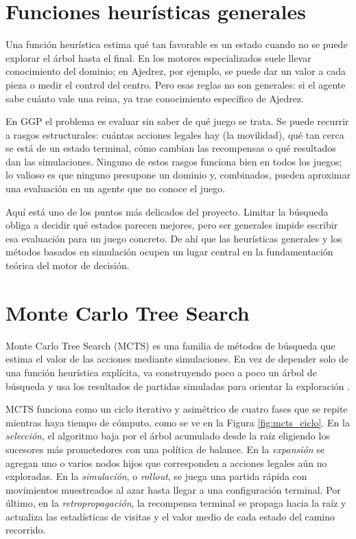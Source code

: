 \section{Funciones heurísticas generales}

Una función heurística estima qué tan favorable es un estado cuando no se puede explorar el árbol hasta el final. En los motores especializados suele llevar conocimiento del dominio; en Ajedrez, por ejemplo, se puede dar un valor a cada pieza o medir el control del centro. Pero esas reglas no son generales: si el agente sabe cuánto vale una reina, ya trae conocimiento específico de Ajedrez.

En GGP el problema es evaluar sin saber de qué juego se trata. Se puede recurrir a rasgos estructurales: cuántas acciones legales hay (la movilidad), qué tan cerca se está de un estado terminal, cómo cambian las recompensas o qué resultados dan las simulaciones. Ninguno de estos rasgos funciona bien en todos los juegos; lo valioso es que ninguno presupone un dominio y, combinados, pueden aproximar una evaluación en un agente que no conoce el juego.

Aquí está uno de los puntos más delicados del proyecto. Limitar la búsqueda obliga a decidir qué estados parecen mejores, pero ser generales impide escribir esa evaluación para un juego concreto. De ahí que las heurísticas generales y los métodos basados en simulación ocupen un lugar central en la fundamentación teórica del motor de decisión.

\section{Monte Carlo Tree Search}

Monte Carlo Tree Search (MCTS) es una familia de métodos de búsqueda que estima el valor de las acciones mediante simulaciones. En vez de depender solo de una función heurística explícita, va construyendo poco a poco un árbol de búsqueda y usa los resultados de partidas simuladas para orientar la exploración \cite{Coulom2006MCTS, Browne2012MCTS}.

MCTS funciona como un ciclo iterativo y asimétrico de cuatro fases que se repite mientras haya tiempo de cómputo, como se ve en la Figura \ref{fig:mcts_ciclo}. En la \textit{selección}, el algoritmo baja por el árbol acumulado desde la raíz eligiendo los sucesores más prometedores con una política de balance. En la \textit{expansión} se agregan uno o varios nodos hijos que corresponden a acciones legales aún no exploradas. En la \textit{simulación}, o \textit{rollout}, se juega una partida rápida con movimientos muestreados al azar hasta llegar a una configuración terminal. Por último, en la \textit{retropropagación}, la recompensa terminal se propaga hacia la raíz y actualiza las estadísticas de visitas y el valor medio de cada estado del camino recorrido.

